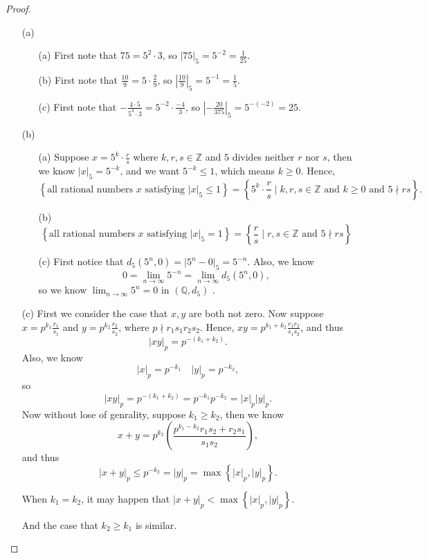 \begin{proof}
  \vphantom{text}
  \begin{itemize}
    \item [(a)] 
    \vphantom{text}
    \begin{itemize}
      \item [(a)] First note that \(75 = 5^2 \cdot 3\), so \(\vert 75 \vert_5 = 5^{-2} = \frac{1}{25}\).   
      \item [(b)] First note that \(\frac{10}{9} = 5 \cdot \frac{2}{9}\), so \(\left\vert \frac{10}{9} \right\vert _5 = 5^{-1} = \frac{1}{5} \).  
      \item [(c)] First note that \(-\frac{4 \cdot 5}{5^3 \cdot 3} = 5^{-2} \cdot \frac{-4}{3}\), so \(\left\vert - \frac{20}{375} \right\vert _ 5 = 5^{-(-2)} = 25 \).  
    \end{itemize}
    \item [(b)] \vphantom{text}
    \begin{itemize}
      \item [(a)]Suppose \(x = 5^k \cdot \frac{r}{s}\) where \(k,r,s \in \mathbb{Z} \) and \(5\) divides neither \(r\) nor \(s\), then we know \(\vert x \vert_5 = 5^{-k}\), and we want \(5^{-k} \le 1\), which means \(k \ge 0\). Hence,
      \[
        \left\{ \text{all rational numbers } x \text{ satisfying } \vert x \vert_5 \le 1  \right\} = \left\{ 5^k \cdot \frac{r}{s} \mid k,r,s \in \mathbb{Z} \text{ and } k \ge 0 \text{ and } 5 \nmid rs \right\}.  
      \]
      \item [(b)] 
      \[
       \left\{ \text{all rational numbers } x \text{ satisfying } \vert x \vert_5 = 1  \right\} = \left\{\frac{r}{s} \mid r,s \in \mathbb{Z} \text{ and } 5 \nmid rs \right\} 
      \]
      \item [(c)] First notice that \(d_5 \left( 5^n, 0 \right) = \vert 5^n - 0 \vert_5 = 5^{-n}  \). Also, we know 
      \[
        0 = \lim_{n \to \infty} 5^{-n} = \lim_{n \to \infty} d_5(5^n, 0), 
      \] so we know \(\lim_{n \to \infty} 5^n = 0 \) in \((\mathbb{Q} , d_5)\) . 
    \end{itemize}
    \item [(c)] First we consider the case that \(x,y\) are both not zero. Now suppose \(x = p^{k_1} \frac{r_1}{s_1}\) and \(y = p^{k_2} \frac{r_2}{s_2}\), where \(p \nmid r_1 s_1 r_2 s_2\). Hence, \(xy = p^{k_1 + k_2} \frac{r_1 r_2}{s_1 s_2}\), and thus 
    \[
      \vert xy \vert_p = p^{-(k_1 + k_2)}. 
    \]   
    Also, we know 
    \[
      \vert x \vert_p = p^{-k_1} \quad \vert y \vert_p = p^{-k_2}, 
    \]
    so 
    \[
      \vert xy \vert_p = p^{-(k_1 + k_2)} = p^{-k_1}p^{-k_2} = \vert x \vert_p \vert y \vert_p.  
    \]
    Now without lose of genrality, suppose \(k_1 \ge k_2\), then we know 
    \[
      x+y = p^{k_2} \left( \frac{p^{k_1 - k_2}r_1 s_2 + r_2 s_1}{s_1 s_2} \right),
    \] and thus 
    \[
      \vert x+y \vert_p \le p^{-k_2} = \vert y \vert_p = \max \left\{ \vert x \vert_p, \vert y \vert_p   \right\}.   
    \]
    \begin{note}
      When \(k_1 = k_2\), it may happen that \(\vert x+y \vert_p < \max \left\{ \vert x \vert_p , \vert y \vert_p   \right\}  \).
    \end{note}
    And the case that \(k_2 \ge k_1\) is similar. 


\end{itemize}
\end{proof}
